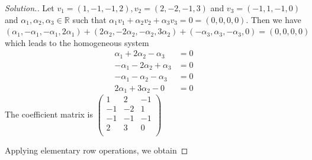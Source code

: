 \documentclass[11pt,a4paper]{article}
\theoremstyle{definition}
\newenvironment{solution}
  {\renewcommand{\qedsymbol}{}\begin{proof}[\textit{Solution}.]}
  {\end{proof}}
\begin{document}
\begin{solution}
Let $v_1=(1,-1,-1,2), v_2=(2,-2,-1,3)$ and $v_3=(-1,1,-1,0)$ and $\alpha_1, \alpha_2,\alpha_3\in \mathbb{R}$ such that $\alpha_1v_1+\alpha_2v_2+\alpha_3v_3=0=(0,0,0,0)$. Then we have \\$(\alpha_1,-\alpha_1,-\alpha_1,2\alpha_1)+(2\alpha_2,-2\alpha_2,-\alpha_2,3\alpha_2)+(-\alpha_3,\alpha_3,-\alpha_3,0)=(0,0,0,0)$ which leads to the homogeneous system
\begin{align*}
\alpha_1+2\alpha_2-\alpha_3 &=0\\
-\alpha_1-2\alpha_2+\alpha_3 &=0\\
-\alpha_1-\alpha_2-\alpha_3 &=0\\
2\alpha_1+3\alpha_2-0 &=0
\end{align*}
The coefficient matrix is $
\begin{pmatrix}
1&2&-1\\-1&-2&1\\-1&-1&-1\\2&3&0\\
\end{pmatrix}
$

Applying elementary row operations, we obtain



\end{solution}
\end{document}
